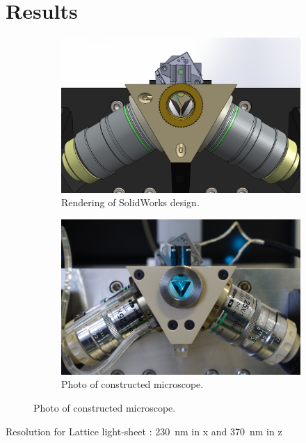 \section{Results}
\begin{figure}[htb]
    \begin{subfigure}[t]{0.5\textwidth}
        \centering
        \includegraphics[width=\textwidth]{front_solidworks_overlay}
        \caption{Rendering of SolidWorks design.}
    \end{subfigure}
    \begin{subfigure}[t]{0.5\textwidth}
        \centering
        \includegraphics[width=\textwidth]{front_photo_overlay}
        \caption{Photo of constructed microscope.}
    \end{subfigure}
    \label{fig:frontView}
\end{figure}

Resolution for Lattice light-sheet \cite{chen_lattice_2014}: \SI{230}{nm} in x and \SI{370}{nm} in z
\cite{chhetri_whole-animal_2015}

